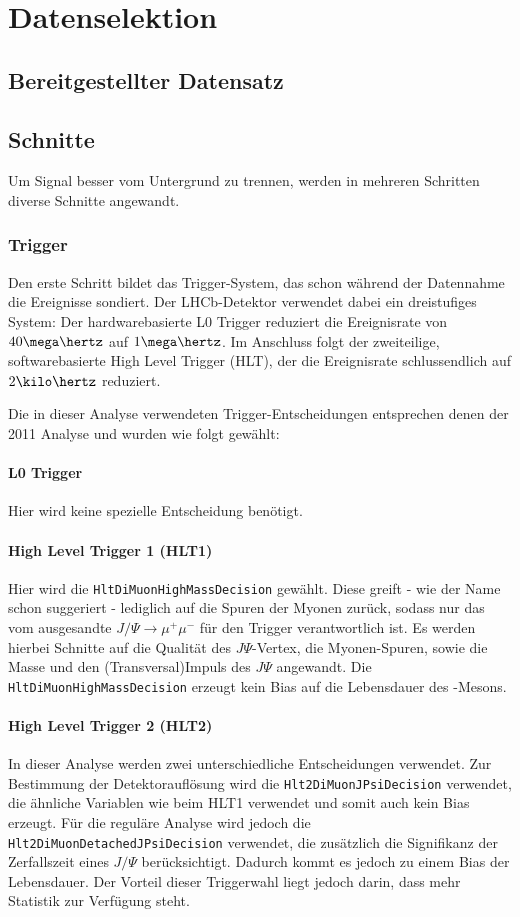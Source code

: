 \chapter{Datenselektion}
\section{Bereitgestellter Datensatz}
\section{Schnitte}
Um Signal besser vom Untergrund zu trennen, werden in mehreren Schritten diverse Schnitte angewandt.
\subsection{Trigger} \label{kap:trigger}
Den erste Schritt bildet das Trigger-System, das schon während der Datennahme die Ereignisse sondiert. Der LHCb-Detektor verwendet dabei ein dreistufiges System: Der hardwarebasierte \glqq L0 Trigger \grqq reduziert die Ereignisrate von $40\mega\hertz$ auf $1\mega\hertz$. Im Anschluss folgt der zweiteilige, softwarebasierte \glqq High Level Trigger \grqq (HLT), der die Ereignisrate schlussendlich auf $2\kilo\hertz$ reduziert.\cite{trigger} 

Die in dieser Analyse verwendeten Trigger-Entscheidungen entsprechen denen der 2011 Analyse \cite{lhcb-paper} und wurden wie folgt gewählt:

\subsubsection{L0 Trigger}
Hier wird keine spezielle Entscheidung benötigt.

\subsubsection{High Level Trigger 1 (HLT1)}
Hier wird die \texttt{HltDiMuonHighMassDecision} gewählt. Diese greift - wie der Name schon suggeriert - lediglich auf die Spuren der Myonen zurück, sodass nur das vom \Bd ausgesandte $J/\Psi \rightarrow \mu^+\mu^-$ für den Trigger verantwortlich ist. Es werden hierbei Schnitte auf die Qualität des $J\Psi$-Vertex, die Myonen-Spuren, sowie die Masse und den (Transversal)Impuls des $J\Psi$ angewandt. Die \texttt{HltDiMuonHighMassDecision} erzeugt kein Bias auf die Lebensdauer des \Bd-Mesons.

\subsubsection{High Level Trigger 2 (HLT2)}
In dieser Analyse werden zwei unterschiedliche Entscheidungen verwendet. Zur Bestimmung der Detektorauflösung wird die \texttt{Hlt2DiMuonJPsiDecision} verwendet, die ähnliche Variablen wie beim HLT1 verwendet und somit auch kein Bias erzeugt. Für die reguläre Analyse wird jedoch die \texttt{Hlt2DiMuonDetachedJPsiDecision} verwendet, die zusätzlich die Signifikanz der Zerfallszeit eines $J/\Psi$ berücksichtigt. Dadurch kommt es jedoch zu einem Bias der Lebensdauer. Der Vorteil dieser Triggerwahl liegt jedoch darin, dass mehr Statistik zur Verfügung steht.


